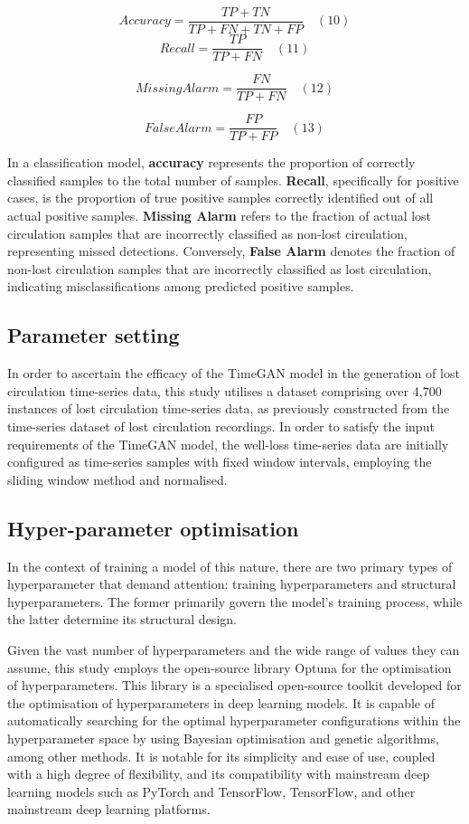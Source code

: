 \documentclass[journal,article,submit,pdftex,moreauthors]{Definitions/mdpi}
\begin{document}
$$ A c c u r a c y = \frac { T P + T N } { T P + F N + T N + F P }\quad (10)$$
$$ R e c a l l = \frac { T P } { T P + F N } \quad (11)$$

$$ M i s sin g A l a r m = \frac { F N } { T P + F N } \quad (12)$$

$$ F a l s e A l a r m = \frac { F P } { T P + F P } \quad (13)$$

In a classification model, \textbf{accuracy} represents the proportion of correctly classified samples to the total number of samples. \textbf{Recall}, specifically for positive cases, is the proportion of true positive samples correctly identified out of all actual positive samples. \textbf{Missing Alarm} refers to the fraction of actual lost circulation samples that are incorrectly classified as non-lost circulation, representing missed detections. Conversely, \textbf{False Alarm} denotes the fraction of non-lost circulation samples that are incorrectly classified as lost circulation, indicating misclassifications among predicted positive samples.

\subsection{Parameter setting }

In order to ascertain the efficacy of the TimeGAN model in the generation of lost circulation time-series data, this study utilises a dataset comprising over 4,700 instances of lost circulation time-series data, as previously constructed from the time-series dataset of lost circulation recordings. In order to satisfy the input requirements of the TimeGAN model, the well-loss time-series data are initially configured as time-series samples with fixed window intervals, employing the sliding window method and normalised.

\subsection{Hyper-parameter optimisation}

In the context of training a model of this nature, there are two primary types of hyperparameter that demand attention: training hyperparameters and structural hyperparameters. The former primarily govern the model's training process, while the latter determine its structural design. 

Given the vast number of hyperparameters and the wide range of values they can assume, this study employs the open-source library Optuna for the optimisation of hyperparameters. This library is a specialised open-source toolkit developed for the optimisation of hyperparameters in deep learning models. It is capable of automatically searching for the optimal hyperparameter configurations within the hyperparameter space by using Bayesian optimisation and genetic algorithms, among other methods. It is notable for its simplicity and ease of use, coupled with a high degree of flexibility, and its compatibility with mainstream deep learning models such as PyTorch and TensorFlow, TensorFlow, and other mainstream deep learning platforms.
\end{document}
